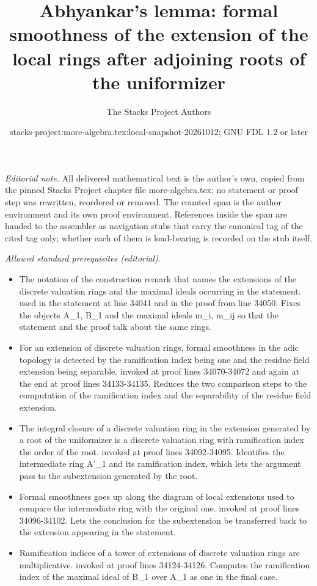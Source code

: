 \documentclass[10pt,a4paper]{amsart}
\title{Abhyankar's lemma: formal smoothness of the extension of the local rings after adjoining roots of the uniformizer}
\author{The Stacks Project Authors}
\date{stacks-project:more-algebra.tex:local-snapshot-20261012; GNU FDL 1.2 or later}
\theoremstyle{plain}
\theoremstyle{definition}
\theoremstyle{remark}
\numberwithin{equation}{subsection}
\begin{document}
\maketitle
\setcounter{subsection}{1}
\noindent\textit{Editorial note.} All delivered mathematical text is the author's own, copied from the pinned Stacks Project chapter file more-algebra.tex; no statement or proof step was rewritten, reordered or removed. The counted span is the author environment and its own proof environment. References inside the span are handed to the assembler as navigation stubs that carry the canonical tag of the cited tag only; whether each of them is load-bearing is recorded on the stub itself.\par\medskip
\noindent\textit{Allowed standard prerequisites (editorial).}\begin{itemize}
\item The notation of the construction remark that names the extensions of the discrete valuation rings and the maximal ideals occurring in the statement. used in the statement at line 34041 and in the proof from line 34050. Fixes the objects A\_1, B\_1 and the maximal ideals m\_i, m\_ij so that the statement and the proof talk about the same rings.
\item For an extension of discrete valuation rings, formal smoothness in the adic topology is detected by the ramification index being one and the residue field extension being separable. invoked at proof lines 34070-34072 and again at the end at proof lines 34133-34135. Reduces the two comparison steps to the computation of the ramification index and the separability of the residue field extension.
\item The integral closure of a discrete valuation ring in the extension generated by a root of the uniformizer is a discrete valuation ring with ramification index the order of the root. invoked at proof lines 34092-34095. Identifies the intermediate ring A'\_1 and its ramification index, which lets the argument pass to the subextension generated by the root.
\item Formal smoothness goes up along the diagram of local extensions used to compare the intermediate ring with the original one. invoked at proof lines 34096-34102. Lets the conclusion for the subextension be transferred back to the extension appearing in the statement.
\item Ramification indices of a tower of extensions of discrete valuation rings are multiplicative. invoked at proof lines 34124-34126. Computes the ramification index of the maximal ideal of B\_1 over A\_1 as one in the final case.
\end{itemize}\medskip
\end{document}
